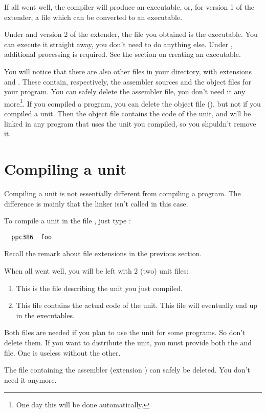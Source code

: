 \documentclass{report}
\begin{document}
If all went well, the compiler will produce an executable, or, for version 1
of the \dos extender, a file which can be converted to an executable.

Under \linux and version 2 of the \dos extender, the file you obtained is 
the executable. You can execute it straight away, you don't need to do 
anything else. Under \dos,
additional processing is required. See the section on creating an
executable.

You will notice that there are also other files in your directory, with
extensions  and . These contain, respectively, 
the assembler sources and the object files for your program. You can
safely delete the assembler file, you don't need it any 
more\footnote{One day this will be done automatically.}. If you compiled a
program, you can delete the object file (), but not if you compiled
a unit. Then the object file contains the code of the unit, and will be
linked in any program that uses the unit you compiled, so you shpuldn't
remove it.


\section{Compiling a unit}

Compiling a unit is not essentially different from compiling a program.
The difference is mainly that the linker isn't called in this case.

To compile a unit in the file , just type :
\begin{verbatim}
  ppc386  foo
\end{verbatim}
Recall the remark about file extensions in the previous section.

When all went well, you will be left with 2 (two) unit files:
\begin{enumerate}
\item {} This is the file describing the unit you just
compiled.
\item {} This file contains the actual code of the unit.
This file will eventually end up in the executables.
\end{enumerate}
Both files are needed if you plan to use the unit for some programs. 
So don't delete them. If you want to distribute the unit, you must
provide both the  and  file. One is useless without the
other.

The file containing the assembler (extension ) can safely be
deleted. You don't need it anymore.
\end{document}

